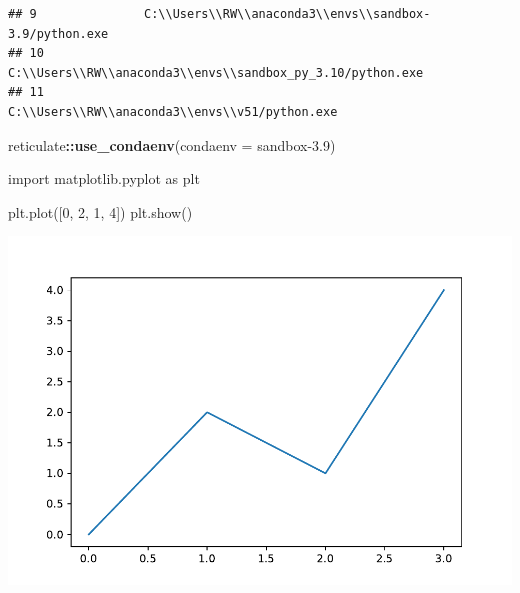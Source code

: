 \documentclass[
]{book}
\newenvironment{Shaded}{\begin{snugshade}}{\end{snugshade}}
\newcommand{\AttributeTok}[1]{\textcolor[rgb]{0.13,0.29,0.53}{#1}}
\newcommand{\DecValTok}[1]{\textcolor[rgb]{0.00,0.00,0.81}{#1}}
\newcommand{\FunctionTok}[1]{\textcolor[rgb]{0.13,0.29,0.53}{\textbf{#1}}}
\newcommand{\ImportTok}[1]{#1}
\newcommand{\NormalTok}[1]{#1}
\newcommand{\SpecialCharTok}[1]{\textcolor[rgb]{0.81,0.36,0.00}{\textbf{#1}}}
\newcommand{\StringTok}[1]{\textcolor[rgb]{0.31,0.60,0.02}{#1}}
\theoremstyle{definition}
\theoremstyle{definition}
\theoremstyle{definition}
\theoremstyle{definition}
\theoremstyle{remark}
\begin{document}
\begin{verbatim}
## 9               C:\\Users\\RW\\anaconda3\\envs\\sandbox-3.9/python.exe
## 10          C:\\Users\\RW\\anaconda3\\envs\\sandbox_py_3.10/python.exe
## 11                      C:\\Users\\RW\\anaconda3\\envs\\v51/python.exe
\end{verbatim}

\begin{Shaded}
\begin{Highlighting}[]
\NormalTok{reticulate}\SpecialCharTok{::}\FunctionTok{use\_condaenv}\NormalTok{(}\AttributeTok{condaenv =} \StringTok{\textquotesingle{}sandbox{-}3.9\textquotesingle{}}\NormalTok{)}
\end{Highlighting}
\end{Shaded}

\begin{Shaded}
\begin{Highlighting}[]
\ImportTok{import}\NormalTok{ matplotlib.pyplot }\ImportTok{as}\NormalTok{ plt}

\NormalTok{plt.plot([}\DecValTok{0}\NormalTok{, }\DecValTok{2}\NormalTok{, }\DecValTok{1}\NormalTok{, }\DecValTok{4}\NormalTok{])}
\NormalTok{plt.show()}
\end{Highlighting}
\end{Shaded}

\includegraphics{202401311000-TikZ_files/figure-latex/unnamed-chunk-168-1}
\end{document}
